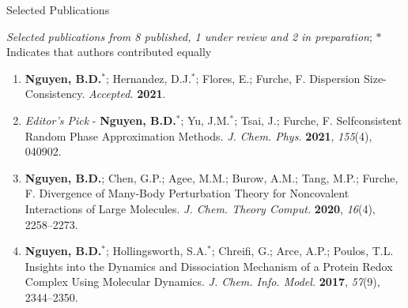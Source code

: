 \documentclass{resume} %
\begin{document}
\begin{rSection}{Selected Publications}

  \textit{Selected publications from 8 published, 1 under review and
    2 in preparation};  
  $*$ Indicates that authors contributed equally
  
\begin{enumerate}
\item \textbf{Nguyen, B.D.}$^*$; Hernandez, D.J.$^*$;
  Flores, E.; Furche, F. Dispersion Size-Consistency. \textit{Accepted.}
  \textbf{2021}.

\item {\em Editor's Pick} - \textbf{Nguyen, B.D.}$^*$; Yu, J.M.$^*$; Tsai, J.;
  Furche, F. Selfconsistent Random Phase Approximation Methods.
  \textit{J. Chem. Phys.} \textbf{2021}, \textit{155}(4), 040902.

%
      
\item \textbf{Nguyen, B.D.}; Chen, G.P.; Agee, M.M.; Burow, A.M.; Tang, M.P.;
  Furche, F. Divergence of Many-Body Perturbation Theory for Noncovalent Interactions
  of Large Molecules. \textit{J. Chem. Theory Comput.} \textbf{2020}, \textit{16}(4),
  2258--2273.

\item \textbf{Nguyen, B.D.}$^*$; Hollingsworth, S.A.$^*$; Chreifi, G.;
  Arce, A.P.; Poulos, T.L. Insights into the Dynamics and Dissociation Mechanism
  of a Protein Redox Complex Using Molecular Dynamics. \textit{J. Chem. Info. Model.}
  \textbf{2017}, \textit{57}(9), 2344--2350.

%
%
  
\end{enumerate}

\end{rSection}
\end{document}
